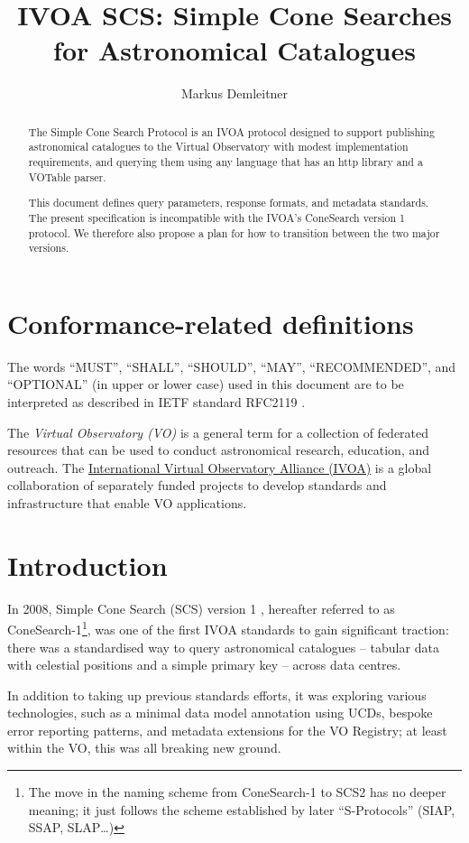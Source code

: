\documentclass[11pt,a4paper]{ivoa}
\title{IVOA SCS: Simple Cone Searches for Astronomical Catalogues}
\author[https://wiki.ivoa.net/twiki/bin/view/IVOA/MarkusDemleitner]{
  Markus Demleitner}
\begin{document}
\begin{abstract}
The Simple Cone Search Protocol is an IVOA protocol designed to support
publishing astronomical catalogues to the Virtual Observatory with
modest implementation requirements, and querying them using any language
that has an http library and a VOTable parser.

This document defines query parameters, response formats, and metadata
standards.  The present specification is incompatible with the IVOA's
ConeSearch version 1 protocol.  We therefore also propose a plan for how
to transition between the two major versions.

\end{abstract}


\section*{Conformance-related definitions}

The words ``MUST'', ``SHALL'', ``SHOULD'', ``MAY'', ``RECOMMENDED'', and
``OPTIONAL'' (in upper or lower case) used in this document are to be
interpreted as described in IETF standard RFC2119 \citep{std:RFC2119}.

The \emph{Virtual Observatory (VO)} is a
general term for a collection of federated resources that can be used
to conduct astronomical research, education, and outreach.
The \href{https://www.ivoa.net}{International
Virtual Observatory Alliance (IVOA)} is a global
collaboration of separately funded projects to develop standards and
infrastructure that enable VO applications.


\section{Introduction}

In 2008, Simple Cone Search (SCS) version 1 \citep{2008ivoa.specQ0222P},
hereafter referred to as ConeSearch-1\footnote{The move in the naming
scheme from ConeSearch-1 to SCS2 has no deeper meaning; it just follows
the scheme established by later ``S-Protocols'' (SIAP, SSAP, SLAP\dots)},
was one of the first IVOA standards to gain
significant traction: there was a standardised way to query astronomical
catalogues -- tabular data with celestial positions and a simple primary
key -- across data centres.

In addition to taking up previous standards efforts, it was exploring
various technologies, such as a minimal data model annotation using UCDs,
bespoke error reporting patterns, and metadata extensions for the VO
Registry; at least within the VO, this was all breaking new ground.
\end{document}
